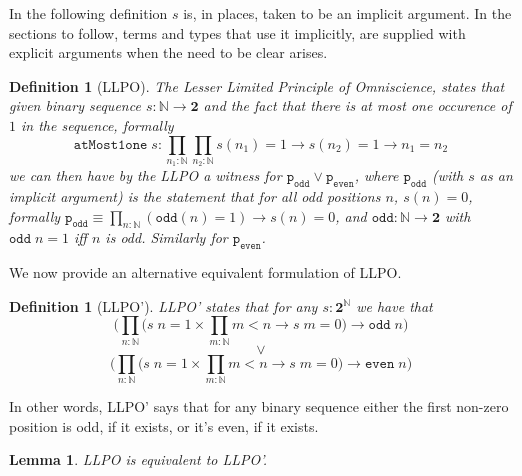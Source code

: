 \documentclass[12pt]{report}
\newtheorem{lem}[thm]{Lemma}
\newtheorem{defn}[thm]{Definition}
\theoremstyle{definition}
\begin{document}
In the following definition $s$ is, in places, taken to be an implicit argument. 
In the sections to follow, terms and types that use it implicitly, are supplied with explicit arguments when the need to be clear arises. 
\begin{defn}[LLPO]\label{LLPO}
The Lesser Limited Principle of Omniscience, states that given binary sequence $s : \mathbb{N} \rightarrow \mathbf{2}$ and the fact that there is at most one occurence of $1$ in the sequence, formally 
$$\mathtt{atMost1one}\; s :\prod_{n_1 : \mathbb{N}} \prod_{n_2 : \mathbb{N}} s(n_1) = 1 \rightarrow s(n_2)= 1 \rightarrow n_1 = n_2$$
we can then have by the LLPO a witness for $\mathtt{p_{odd}} \vee \mathtt{p_{even}}$, where $\mathtt{p_{odd}}$ (with $s$ as an implicit argument) is the statement that for all odd positions $n$, $s(n) = 0$, formally $\mathtt{p_{odd}} \equiv \prod_{n : \mathbb{N}} (\mathtt{odd}(n) = 1) \rightarrow s(n) = 0$, and $\mathtt{odd} : \mathbb{N}\rightarrow \mathbf{2}$ with $\mathtt{odd}\; n = 1$ iff $n$ is odd. 
Similarly for $\mathtt{p_{even}}$. 
\end{defn}
We now provide an alternative equivalent formulation of LLPO. 
\begin{defn}[LLPO']
LLPO' states that for any $s: \mathbf{2}^\mathbb{N}$ we have that
$$ \Big( \prod_{n : \mathbb{N}} \big( s\;n = 1 \times \prod_{m : \mathbb{N}} m < n \rightarrow s\;m=0 \big) \rightarrow \mathtt{odd}\;n \Big)$$
\center$$\vee$$
$$ \Big( \prod_{n : \mathbb{N}} \big( s\;n = 1 \times \prod_{m : \mathbb{N}} m < n \rightarrow s\;m=0 \big) \rightarrow \mathtt{even}\;n \Big)$$
\end{defn}
In other words, LLPO' says that for any binary sequence either the first non-zero position is odd, if it exists, or it's even, if it exists. 
\begin{lem}
LLPO is equivalent to LLPO'.
\end{lem}
\end{document}
